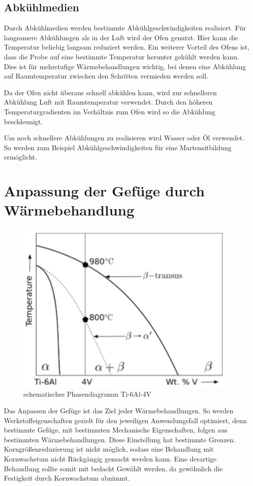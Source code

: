 \documentclass[a4paper, 11pt]{tubsreprt}
\begin{document}
\subsection{Abkühlmedien}

Durch Abkühlmedien werden bestimmte Abkühlgeschwindigkeiten realisiert. Für langsamere Abkühlungen als in der Luft wird der Ofen genutzt. Hier kann die Temperatur beliebig langsam reduziert werden. Ein weiterer Vorteil des Ofens ist, dass die Probe auf eine bestimmte Temperatur herunter gekühlt werden kann. Dies ist für mehrstufige Wärmebehandlungen wichtig, bei denen eine Abkühlung auf Raumtemperatur zwischen den Schritten vermieden werden soll. 

Da der Ofen nicht überaus schnell abkühlen kann, wird zur schnelleren Abkühlung Luft mit Raumtemperatur verwendet. Durch den höheren Temperaturgradienten im Verhältnis zum Ofen wird so die Abkühlung beschleunigt.  

Um noch schnellere Abkühlungen zu realisieren wird Wasser oder Öl verwendet. So werden zum Beispiel Abkühlgeschwindigkeiten für eine Martensitbildung ermöglicht.
\section{Anpassung der Gefüge durch Wärmebehandlung}
\begin{figure}
	\centering
	\includegraphics[scale=0.9]{Bilder/Phasendiagram.PNG}
	\caption[Phasendiagramm]{schematisches Phasendiagramm Ti-6Al-4V \cite{Babu2008}}
	\label{Phasendiagram}
\end{figure}
Das Anpassen der Gefüge ist das Ziel jeder Wärmebehandlungen. So werden Werkstoffeigenschaften gezielt für den jeweiligen Anwendungsfall optimiert, denn bestimmte Gefüge, mit bestimmten Mechanische Eigenschaften, folgen aus bestimmten Wärmebehandlungen. Diese Einstellung hat bestimmte Grenzen. Korngrößenreduzierung ist nicht möglich, sodass eine Behandlung mit Kornwachstum nicht Rückgängig gemacht werden kann. Eine derartige Behandlung sollte somit mit bedacht Gewählt werden, da gewöhnlich die Festigkeit durch Kornwachstum abnimmt.
\end{document}
